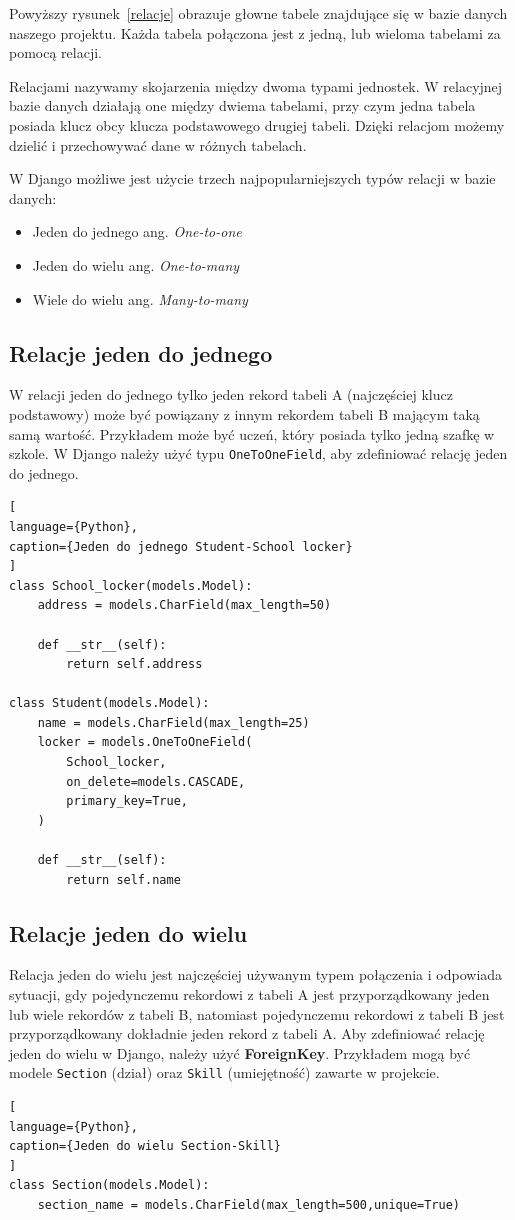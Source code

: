 \documentclass[oneside,polski,logo,indent]{amuthesis}
\begin{document}
\begin{enumerate}
\begin{enumerate}
\noindent Powyższy rysunek~\ref{relacje} obrazuje głowne tabele znajdujące się w bazie danych naszego projektu. Każda tabela połączona jest z jedną, lub wieloma tabelami za pomocą relacji.

Relacjami nazywamy skojarzenia między dwoma typami jednostek. W relacyjnej bazie danych działają one między dwiema tabelami, przy czym jedna tabela posiada klucz obcy klucza podstawowego drugiej tabeli. Dzięki relacjom możemy dzielić i przechowywać dane w różnych tabelach.

W Django możliwe jest użycie trzech najpopularniejszych typów relacji w bazie danych:
\begin{itemize}
\item Jeden do jednego ang. \emph{One-to-one}
\item Jeden do wielu ang. \emph{One-to-many}
\item Wiele do wielu ang. \emph{Many-to-many}

\end{itemize}
\subsection{Relacje jeden do jednego}
W relacji jeden do jednego tylko jeden rekord tabeli A (najczęściej klucz podstawowy) może być powiązany z innym rekordem tabeli B mającym taką samą wartość. Przykładem może być uczeń, który posiada tylko jedną szafkę w szkole.
W Django należy użyć typu \texttt{OneToOneField}, aby zdefiniować relację jeden do jednego.
\begin{lstlisting}[
language={Python},
caption={Jeden do jednego Student-School locker}
]
class School_locker(models.Model):
    address = models.CharField(max_length=50)

    def __str__(self):
        return self.address

class Student(models.Model):
    name = models.CharField(max_length=25)
    locker = models.OneToOneField(
        School_locker,
        on_delete=models.CASCADE,
        primary_key=True,
    )

    def __str__(self):
        return self.name
\end{lstlisting}
\subsection{Relacje jeden do wielu}

Relacja jeden do wielu jest najczęściej używanym typem połączenia i odpowiada sytuacji, gdy pojedynczemu rekordowi z tabeli A jest przyporządkowany jeden lub wiele rekordów z tabeli B, natomiast pojedynczemu rekordowi z tabeli B jest przyporządkowany dokładnie jeden rekord z tabeli A.
Aby zdefiniować relację jeden do wielu w Django, należy użyć \textbf{ForeignKey}. Przykładem mogą być modele \texttt{Section} (dział) oraz \texttt{Skill} (umiejętność) zawarte w projekcie.
\begin{lstlisting}[
language={Python},
caption={Jeden do wielu Section-Skill}
]
class Section(models.Model):
    section_name = models.CharField(max_length=500,unique=True)


\end{lstlisting}
\end{enumerate}
\end{enumerate}
\end{document}

